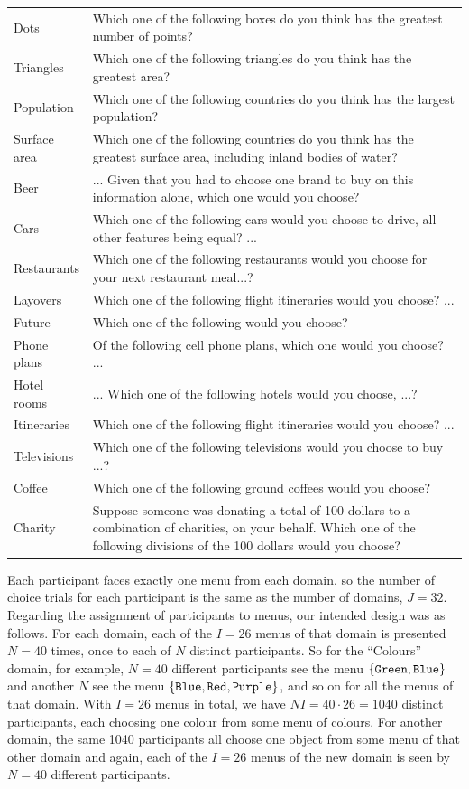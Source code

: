 \documentclass[11pt,letter]{article}
\newcommand{\menu}{menu}
\newcommand{\menus}{menus}
\begin{document}
\begin{table}[h!]
\begin{small}
\begin{tabular}{lp{12cm}}
		  Dots & Which one of the following boxes do you think has the greatest number of points? \\
		  Triangles & Which one of the following triangles do you think has the greatest area? \\
		  Population & Which one of the following countries do you think has the largest population? \\
		  Surface area & Which one of the following countries do you think has the greatest surface area, including inland bodies of water? \\
		  Beer & ... Given that you had to choose one brand to buy on this information alone, which one would you choose? \\
		  Cars & Which one of the following cars would you choose to drive, all other features being equal? ... \\
		  Restaurants & Which one of the following restaurants would you choose for your next restaurant meal...? \\
		  Layovers & Which one of the following flight itineraries would you choose? ... \\
		  Future & Which one of the following would you choose? \\
		  Phone plans & Of the following cell phone plans, which one would you choose? ... \\
		  Hotel rooms & ... Which one of the following hotels would you choose, ...? \\
		  Itineraries & Which one of the following flight itineraries would you choose? ... \\
		  Televisions & Which one of the following televisions would you choose to buy ...? \\
		  Coffee & Which one of the following ground coffees would you choose? \\
		  Charity & Suppose someone was donating a total of 100 dollars to a combination of charities, on your behalf.
      Which one of the following divisions of the 100 dollars would you choose? \\
    \end{tabular}
  \end{small}
\end{table}

Each participant faces exactly one \menu{} from each domain, so the number of choice trials for each participant is the same as the number of domains, $J=32$.
Regarding the assignment of participants to \menus{}, our intended design was as follows.
For each domain, each of the $I = 26$ \menus{} of that domain is presented $N=40$ times, once to each of $N$ distinct participants.
So for the ``Colours'' domain, for example, $N = 40$ different participants see the \menu{} $\{\tt{Green}, \tt{Blue}\}$ and another $N$ see the \menu{} $\{\tt{Blue}, \tt{Red},\tt{Purple}\}$, and so on for all the menus of that domain.
With $I=26$ menus in total, we have $NI = 40\cdot 26 = 1040$ distinct participants, each choosing one colour from some menu of colours.
For another domain, the same 1040 participants all choose one object from some menu of that other domain and again, each of the $I=26$ menus of the new domain is seen by $N=40$ different participants.
\end{document}
